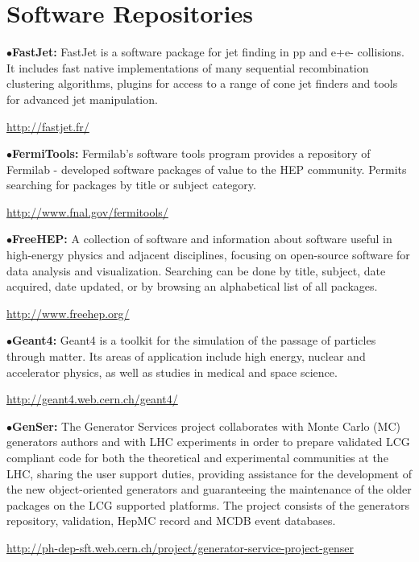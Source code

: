 \section{Software Repositories}  %

\medskip

\medskip

\item{$\bullet$}{\bf FastJet:} FastJet is a software package for jet finding in pp and e+e- collisions. It includes fast native implementations of many sequential recombination clustering algorithms, plugins for access to a range of cone jet finders and tools for advanced jet manipulation.
	\item{}\qquad\url{http://fastjet.fr/}

\medskip

\item{$\bullet$}{\bf FermiTools:}
Fermilab's software tools program provides a repository of Fermilab - developed software packages of value to the HEP community. Permits searching for packages by title or subject category.
	\item{}\qquad\url{http://www.fnal.gov/fermitools/}

\medskip

\item{$\bullet$}{\bf FreeHEP:}
A collection of software and information about software useful in high-energy physics and adjacent disciplines, focusing on open-source software for data analysis and visualization. Searching can be done by title, subject, date acquired, date updated, or by browsing an alphabetical list of all packages.
	\item{}\qquad\url{http://www.freehep.org/}

\medskip

\item{$\bullet$}{\bf Geant4:}
Geant4 is a toolkit for the simulation of the passage of particles through matter. Its areas of application include high energy, nuclear and accelerator physics, as well as studies in medical and space science.
	\item{}\qquad\url{http://geant4.web.cern.ch/geant4/}

\medskip

\item{$\bullet$}{\bf GenSer:} The Generator Services project collaborates with Monte Carlo (MC) generators authors and with LHC experiments in order to prepare validated LCG compliant code for both the theoretical and experimental communities at the LHC, sharing the user support duties, providing assistance for the development of the new object-oriented generators and guaranteeing the maintenance of the older packages on the LCG supported platforms. The project consists of the generators repository, validation, HepMC record and MCDB event databases.
	\item{}\quad\url{http://ph-dep-sft.web.cern.ch/project/generator-service-project-genser}

